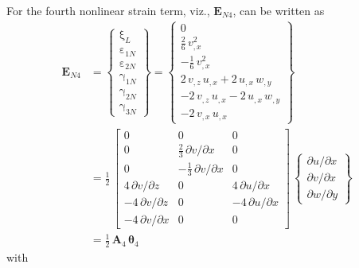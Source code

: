 For the fourth nonlinear strain term, viz., $\mathbf{E}_{N4}$, can be written as
\begin{equation}
	\begin{aligned}
		\mathbf{E}_{N4} & =  \begin{Bmatrix}
			\mathrm \xi_{L} \\
			\mathrm \varepsilon_{1N} \\                    
			\mathrm \varepsilon_{2N} \\           
			\mathrm \gamma_{1N} \\                
			\mathrm \gamma_{2N} \\                
			\mathrm \gamma_{3N} \end{Bmatrix} =   
		\begin{Bmatrix}                       
			0\\
			\tfrac{2}{6} \, v_{,x}^2   \\
			- \tfrac{1}{6} \, v_{,x}^2  \\
			2 \, v_{,z} \, u_{,x} + 2 \, u_{,x} \, w_{,y}   \\
			- 2 \, v_{,z} \, u_{,x} - 2 \, u_{,x} \, w_{,y} \\ 
			- 2 \, v_{,x} \, u_{,x}  \end{Bmatrix} \\
		& = \frac{1}{2} \, \begin{bmatrix}
			0 & 0 &  0   \\
			0 &  \tfrac{2}{3} \, \partial v / \partial x & 0  \\
			0 &  - \tfrac{1}{3} \, \partial v / \partial x & 0 \\
			4 \, \partial v / \partial z &  0 & 4 \, \partial u / \partial x  \\
			-4 \,\partial v / \partial z &  0 & -4 \,\partial u / \partial x  \\
			-4 \,\partial v / \partial x &  0 & 0  \end{bmatrix} \, \begin{Bmatrix}
			\partial u / \partial x\\
			\partial v / \partial x \\
			\partial w / \partial y
		\end{Bmatrix} \\
	    &	= \tfrac{1}{2} \, \mathbf{A}_4 \, \boldsymbol{\theta}_4
	\end{aligned}
\end{equation}
with  
